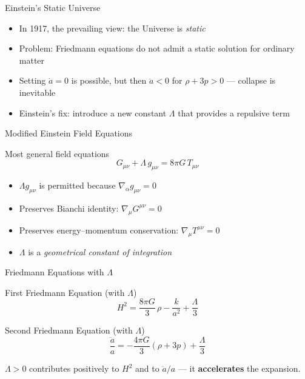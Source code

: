 \documentclass[aspectratio=169,11pt]{beamer}
\begin{document}
\begin{frame}{Einstein's Static Universe}
\begin{itemize}
    \item In 1917, the prevailing view: the Universe is \emph{static}
    \item Problem: Friedmann equations do not admit a static solution for ordinary matter
    \item Setting $\dot{a}=0$ is possible, but then $\ddot{a}<0$ for $\rho+3p>0$ --- collapse is inevitable
    \item Einstein's fix: introduce a new constant $\Lambda$ that provides a repulsive term
\end{itemize}
\end{frame}

\begin{frame}{Modified Einstein Field Equations}
\begin{block}{Most general field equations}
\begin{equation*}
    G_{\mu\nu} + \Lambda\,g_{\mu\nu} = 8\pi G\,T_{\mu\nu}
\end{equation*}
\end{block}
\begin{itemize}
    \item $\Lambda g_{\mu\nu}$ is permitted because $\nabla_\alpha g_{\mu\nu}=0$
    \item Preserves Bianchi identity: $\nabla_\mu G^{\mu\nu}=0$
    \item Preserves energy--momentum conservation: $\nabla_\mu T^{\mu\nu}=0$
    \item $\Lambda$ is a \emph{geometrical constant of integration}
\end{itemize}
\end{frame}

\begin{frame}{Friedmann Equations with $\Lambda$}
\begin{alertblock}{First Friedmann Equation (with $\Lambda$)}
\begin{equation*}
    H^2 = \frac{8\pi G}{3}\,\rho - \frac{k}{a^2} + \frac{\Lambda}{3}
\end{equation*}
\end{alertblock}

\begin{alertblock}{Second Friedmann Equation (with $\Lambda$)}
\begin{equation*}
    \frac{\ddot{a}}{a} = -\frac{4\pi G}{3}(\rho+3p) + \frac{\Lambda}{3}
\end{equation*}
\end{alertblock}

$\Lambda>0$ contributes positively to $H^2$ and to $\ddot{a}/a$ --- it \textbf{accelerates} the expansion.
\end{frame}
\end{document}
